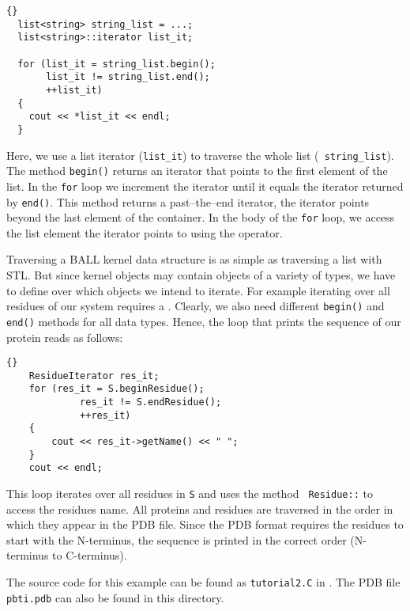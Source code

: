 \begin{lstlisting}{}
  list<string> string_list = ...;
  list<string>::iterator list_it;
	
  for (list_it = string_list.begin(); 
       list_it != string_list.end();
       ++list_it)
  {
    cout << *list_it << endl;
  }
\end{lstlisting}

\noindent
Here, we use a list iterator ({\tt list\_it}) to traverse the whole list ({\tt
string\_list}). The method {\tt begin()} returns an iterator that points to
the first element of the list. In the {\tt for} loop we increment the iterator
until it equals the iterator returned by {\tt end()}. This method returns a
past--the--end iterator, \ie the iterator points beyond the last element of
the container. In the body of the {\tt for} loop, we access the list element
the iterator points to using the {\tt *} operator. 

Traversing a BALL kernel data structure is as simple as traversing a list with
STL. But since kernel objects may contain objects of a variety of types,
we have to define over which objects we intend to iterate.
For example iterating over all residues of our system requires a
. Clearly, we also need different {\tt begin()} and
{\tt end()} methods for all data types. Hence, the loop that prints the
sequence of our protein reads as follows:

\begin{lstlisting}{}
	ResidueIterator res_it;
	for (res_it = S.beginResidue(); 
			 res_it != S.endResidue();
			 ++res_it)
	{
		cout << res_it->getName() << " ";
	}
	cout << endl;
\end{lstlisting}

\noindent
This loop iterates over all residues in {\tt S} and uses the method {\tt
Residue::} to access the residues name. All proteins and
residues are traversed in the order in which they appear in the PDB file.
Since the PDB format requires the residues to start with the N-terminus,
the sequence is printed  in the correct order (N-terminus to C-terminus). 

The source code for this example can be found as {\tt tutorial2.C} in
. The PDB file {\tt pbti.pdb} can also be found
in this directory.
